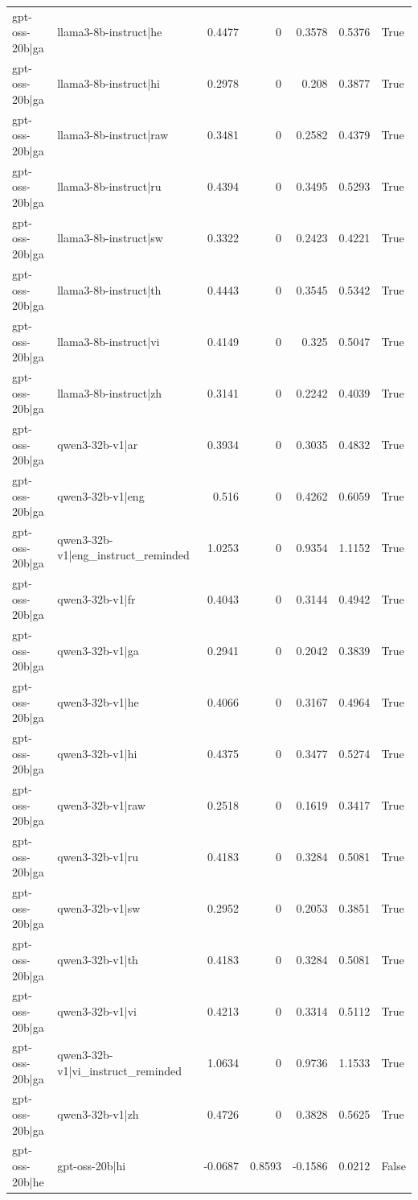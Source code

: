 \begin{table}
\begin{tabular}{l l r r r r l}
gpt-oss-20b|ga & llama3-8b-instruct|he & 0.4477 & 0 & 0.3578 & 0.5376 & True \\
gpt-oss-20b|ga & llama3-8b-instruct|hi & 0.2978 & 0 & 0.208 & 0.3877 & True \\
gpt-oss-20b|ga & llama3-8b-instruct|raw & 0.3481 & 0 & 0.2582 & 0.4379 & True \\
gpt-oss-20b|ga & llama3-8b-instruct|ru & 0.4394 & 0 & 0.3495 & 0.5293 & True \\
gpt-oss-20b|ga & llama3-8b-instruct|sw & 0.3322 & 0 & 0.2423 & 0.4221 & True \\
gpt-oss-20b|ga & llama3-8b-instruct|th & 0.4443 & 0 & 0.3545 & 0.5342 & True \\
gpt-oss-20b|ga & llama3-8b-instruct|vi & 0.4149 & 0 & 0.325 & 0.5047 & True \\
gpt-oss-20b|ga & llama3-8b-instruct|zh & 0.3141 & 0 & 0.2242 & 0.4039 & True \\
gpt-oss-20b|ga & qwen3-32b-v1|ar & 0.3934 & 0 & 0.3035 & 0.4832 & True \\
gpt-oss-20b|ga & qwen3-32b-v1|eng & 0.516 & 0 & 0.4262 & 0.6059 & True \\
gpt-oss-20b|ga & qwen3-32b-v1|eng_instruct_reminded & 1.0253 & 0 & 0.9354 & 1.1152 & True \\
gpt-oss-20b|ga & qwen3-32b-v1|fr & 0.4043 & 0 & 0.3144 & 0.4942 & True \\
gpt-oss-20b|ga & qwen3-32b-v1|ga & 0.2941 & 0 & 0.2042 & 0.3839 & True \\
gpt-oss-20b|ga & qwen3-32b-v1|he & 0.4066 & 0 & 0.3167 & 0.4964 & True \\
gpt-oss-20b|ga & qwen3-32b-v1|hi & 0.4375 & 0 & 0.3477 & 0.5274 & True \\
gpt-oss-20b|ga & qwen3-32b-v1|raw & 0.2518 & 0 & 0.1619 & 0.3417 & True \\
gpt-oss-20b|ga & qwen3-32b-v1|ru & 0.4183 & 0 & 0.3284 & 0.5081 & True \\
gpt-oss-20b|ga & qwen3-32b-v1|sw & 0.2952 & 0 & 0.2053 & 0.3851 & True \\
gpt-oss-20b|ga & qwen3-32b-v1|th & 0.4183 & 0 & 0.3284 & 0.5081 & True \\
gpt-oss-20b|ga & qwen3-32b-v1|vi & 0.4213 & 0 & 0.3314 & 0.5112 & True \\
gpt-oss-20b|ga & qwen3-32b-v1|vi_instruct_reminded & 1.0634 & 0 & 0.9736 & 1.1533 & True \\
gpt-oss-20b|ga & qwen3-32b-v1|zh & 0.4726 & 0 & 0.3828 & 0.5625 & True \\
gpt-oss-20b|he & gpt-oss-20b|hi & -0.0687 & 0.8593 & -0.1586 & 0.0212 & False \\

\end{tabular}
\end{table}
